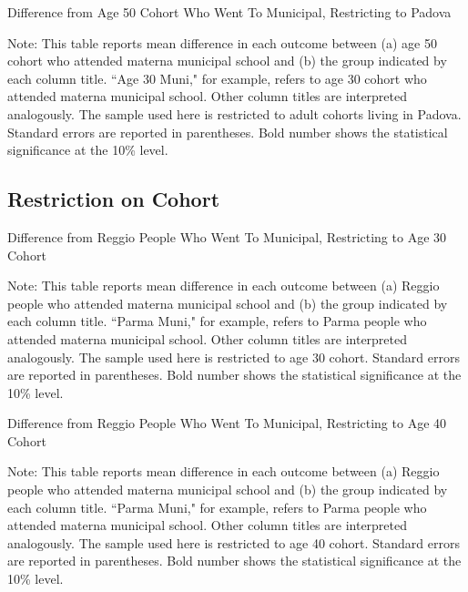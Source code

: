 \documentclass[11pt]{article}
\begin{document}
\begin{table}[H]
\begin{center}
	\caption{Difference from Age 50 Cohort Who Went To Municipal, Restricting to Padova}
	\scalebox{0.83}{
		}
\end{center}
\footnotesize
Note: This table reports mean difference in each outcome between (a) age 50 cohort who attended materna municipal school and (b) the group indicated by each column title. ``Age 30 Muni," for example, refers to age 30 cohort who attended materna municipal school. Other column titles are interpreted analogously. The sample used here is restricted to adult cohorts living in Padova. Standard errors are reported in parentheses. Bold number shows the statistical significance at the 10\% level. 
\end{table}


\subsection{Restriction on Cohort}
\begin{table}[H]
\begin{center}
	\caption{Difference from Reggio People Who Went To Municipal, Restricting to Age 30 Cohort}
	\scalebox{0.83}{
		}
\end{center}
\footnotesize
Note: This table reports mean difference in each outcome between (a) Reggio people who attended materna municipal school and (b) the group indicated by each column title. ``Parma Muni," for example, refers to Parma people who attended materna municipal school. Other column titles are interpreted analogously. The sample used here is restricted to age 30 cohort. Standard errors are reported in parentheses. Bold number shows the statistical significance at the 10\% level. 
\end{table}

\begin{table}[H]
\begin{center}
	\caption{Difference from Reggio People Who Went To Municipal, Restricting to Age 40 Cohort}
	\scalebox{0.83}{
		}
\end{center}
\footnotesize
Note: This table reports mean difference in each outcome between (a) Reggio people who attended materna municipal school and (b) the group indicated by each column title. ``Parma Muni," for example, refers to Parma people who attended materna municipal school. Other column titles are interpreted analogously. The sample used here is restricted to age 40 cohort. Standard errors are reported in parentheses. Bold number shows the statistical significance at the 10\% level. 
\end{table}
\end{document}
